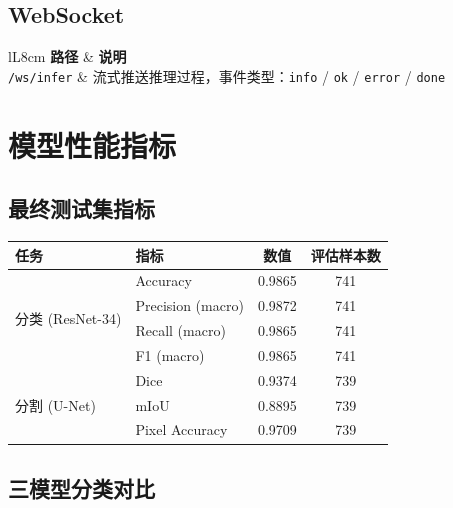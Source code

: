 \documentclass[12pt, a4paper, openany]{ctexbook}
\begin{document}
\section{WebSocket}

\begin{center}
\begin{tabular}{lL{8cm}}
  \toprule
  \textbf{路径} & \textbf{说明} \\
  \midrule
  \texttt{/ws/infer} & 流式推送推理过程，事件类型：\texttt{info} / \texttt{ok} / \texttt{error} / \texttt{done} \\
  \bottomrule
\end{tabular}
\end{center}

\chapter{模型性能指标}

\section{最终测试集指标}

\begin{center}
\begin{tabular}{llcc}
  \toprule
  \textbf{任务} & \textbf{指标} & \textbf{数值} & \textbf{评估样本数} \\
  \midrule
  \multirow{4}{*}{分类 (ResNet-34)} & Accuracy           & 0.9865 & 741 \\
                                    & Precision (macro)  & 0.9872 & 741 \\
                                    & Recall (macro)     & 0.9865 & 741 \\
                                    & F1 (macro)         & 0.9865 & 741 \\
  \midrule
  \multirow{3}{*}{分割 (U-Net)}     & Dice               & 0.9374 & 739 \\
                                    & mIoU               & 0.8895 & 739 \\
                                    & Pixel Accuracy     & 0.9709 & 739 \\
  \bottomrule
\end{tabular}
\end{center}

\section{三模型分类对比}
\end{document}
